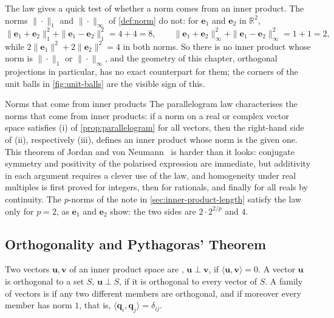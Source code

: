 The law gives a quick test of whether a norm comes from an inner product. The norms $\|\cdot\|_1$ and $\|\cdot\|_\infty$ of \cref{def:norm} do not: for $\mathbf e_1$ and $\mathbf e_2$ in $\mathbb R^2$,
\[
\|\mathbf e_1+\mathbf e_2\|_1^2+\|\mathbf e_1-\mathbf e_2\|_1^2=4+4=8,\qquad\|\mathbf e_1+\mathbf e_2\|_\infty^2+\|\mathbf e_1-\mathbf e_2\|_\infty^2=1+1=2,
\]
while $2\|\mathbf e_1\|^2+2\|\mathbf e_2\|^2=4$ in both norms. So there is no inner product whose norm is $\|\cdot\|_1$ or $\|\cdot\|_\infty$, and the geometry of this chapter, orthogonal projections in particular, has no exact counterpart for them; the corners of the unit balls in \cref{fig:unit-balls} are the visible sign of this.

\begin{note}{Norms that come from inner products}
The parallelogram law characterises the norms that come from inner products: if a norm on a real or complex vector space satisfies (i) of \cref{prop:parallelogram} for all vectors, then the right-hand side of (ii), respectively (iii), defines an inner product whose norm is the given one. This theorem of Jordan and von Neumann~\cite{jordanvonneumann1935} is harder than it looks: conjugate symmetry and positivity of the polarised expression are immediate, but additivity in each argument requires a clever use of the law, and homogeneity under real multiples is first proved for integers, then for rationals, and finally for all reals by continuity. The $p$-norms of the note in \cref{sec:inner-product-length} satisfy the law only for $p=2$, as $\mathbf e_1$ and $\mathbf e_2$ show: the two sides are $2\cdot2^{2/p}$ and $4$.
\end{note}

\subsection{Orthogonality and Pythagoras' Theorem}

\begin{definition}[Orthogonality]
\label{def:orthogonality}
Two vectors $\mathbf u,\mathbf v$ of an inner product space are , $\mathbf u\perp\mathbf v$, if $\langle\mathbf u,\mathbf v\rangle=0$. A vector $\mathbf u$ is orthogonal to a set $S$, $\mathbf u\perp S$, if it is orthogonal to every vector of $S$. A family of vectors is  if any two different members are orthogonal, and  if moreover every member has norm $1$, that is, $\langle\mathbf q_i,\mathbf q_j\rangle=\delta_{ij}$.
\end{definition}


